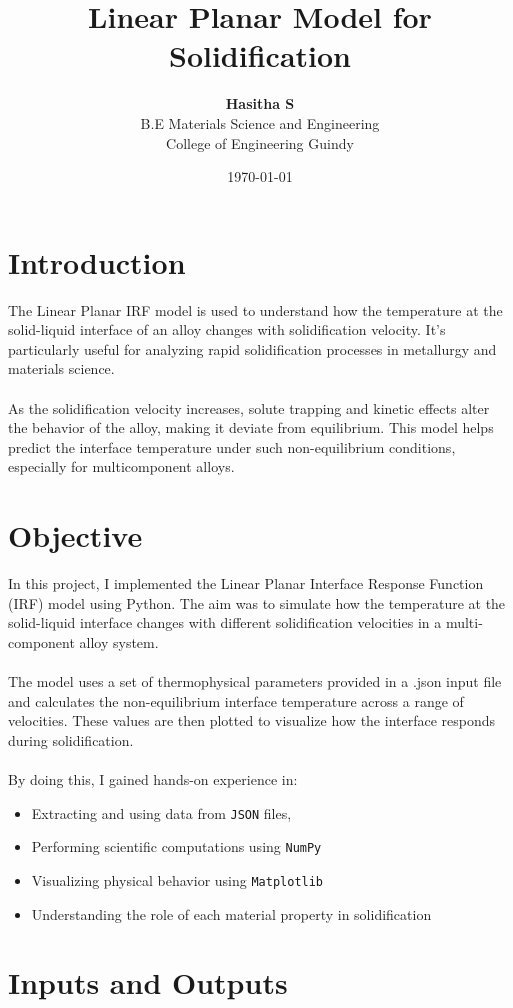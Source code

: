 \documentclass{article}
\title{\textbf{Linear Planar Model for Solidification}}
\author{\textbf{Hasitha S}\\ 
        \small{B.E Materials Science and Engineering}\\ 
        \small{College of Engineering Guindy} }
\date{\today}
\begin{document}
\maketitle

\section{Introduction}
The Linear Planar IRF model is used to understand how the temperature at the solid-liquid interface of an alloy changes with solidification velocity. It's particularly useful for analyzing rapid solidification processes in metallurgy and materials science.
\\ \\As the solidification velocity increases, solute trapping and kinetic effects alter the behavior of the alloy, making it deviate from equilibrium. This model helps predict the interface temperature under such non-equilibrium conditions, especially for multicomponent alloys.

\section{Objective}
In this project, I implemented the Linear Planar Interface Response Function (IRF) model using Python. The aim was to simulate how the temperature at the solid-liquid interface changes with different solidification velocities in a multi-component alloy system.
\\ \\The model uses a set of thermophysical parameters provided in a .json input file and calculates the non-equilibrium interface temperature across a range of velocities. These values are then plotted to visualize how the interface responds during solidification.
\\ \\By doing this, I gained hands-on experience in:

\begin{itemize}
    \item Extracting and using data from \texttt{JSON} files,
    \item Performing scientific computations using \texttt{NumPy}
    \item Visualizing physical behavior using \texttt{Matplotlib}
    \item Understanding the role of each material property in solidification
\end{itemize}

\section{Inputs and Outputs}
\end{document}
